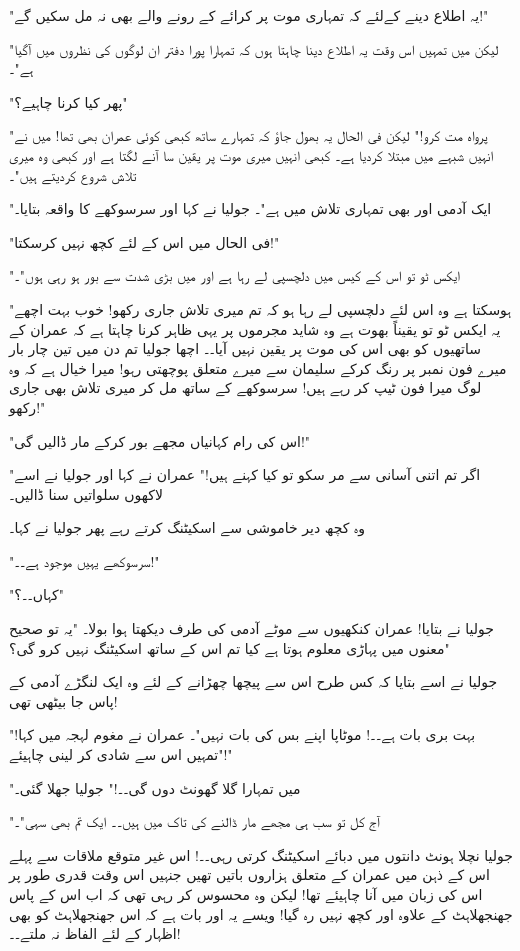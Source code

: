 "یہ اطلاع دینے کےلئے کہ تمہاری موت پر کرائے کے رونے والے بھی نہ مل سکیں گے!"

"لیکن میں تمہیں اس وقت یہ اطلاع دینا چاہتا ہوں کہ تمہارا پورا دفتر ان لوگوں کی نظروں میں آگیا ہے"۔

"پھر کیا کرنا چاہیے؟"

"پرواہ مت کرو!" لیکن فی الحال یہ بھول جاؤ کہ تمہارے ساتھ کبھی کوئی عمران بھی تھا! میں نے انہیں شبہے میں مبتلا کردیا ہے۔ کبھی انہیں میری موت پر یقین سا آنے لگتا ہے اور کبھی وہ میری تلاش شروع کردیتے ہیں"۔

"ایک آدمی اور بھی تمہاری تلاش میں ہے"۔ جولیا نے کہا اور سرسوکھے کا واقعہ بتایا۔

"فی الحال میں اس کے لئے کچھ نہیں کرسکتا!"

"ایکس ٹو تو اس کے کیس میں دلچسپی لے رہا ہے اور میں بڑی شدت سے بور ہو رہی ہوں"۔

"ہوسکتا ہے وہ اس لئے دلچسپی لے رہا ہو کہ تم میری تلاش جاری رکھو! خوب بہت اچھے یہ ایکس ٹو تو یقیناً بھوت ہے وہ شاید مجرموں پر یہی ظاہر کرنا چاہتا ہے کہ عمران کے ساتھیوں کو بھی اس کی موت پر یقین نہیں آیا۔۔ اچھا جولیا تم دن میں تین چار بار میرے فون نمبر پر رنگ کرکے سلیمان سے میرے متعلق پوچھتی رہو! میرا خیال ہے کہ وہ لوگ میرا فون ٹیپ کر رہے ہیں! سرسوکھے کے ساتھ مل کر میری تلاش بھی جاری رکھو!"

"اس کی رام کہانیاں مجھے بور کرکے مار ڈالیں گی!"

"اگر تم اتنی آسانی سے مر سکو تو کیا کہنے ہیں!" عمران نے کہا اور جولیا نے اسے لاکھوں سلواتیں سنا ڈالیں۔

وہ کچھ دیر خاموشی سے اسکیٹنگ کرتے رہے پھر جولیا نے کہا۔

"سرسوکھے یہیں موجود ہے۔۔!"

"کہاں۔۔؟"

جولیا نے بتایا! عمران کنکھیوں سے موٹے آدمی کی طرف دیکھتا ہوا بولا۔ "یہ تو صحیح معنوں میں پہاڑی معلوم ہوتا ہے کیا تم اس کے ساتھ اسکیٹنگ نہیں کرو گی؟"

جولیا نے اسے بتایا کہ کس طرح اس سے پیچھا چھڑانے کے لئے وہ ایک لنگڑے آدمی کے پاس جا بیٹھی تھی!

"بہت بری بات ہے۔۔! موٹاپا اپنے بس کی بات نہیں"۔ عمران نے مغوم لہجہ میں کہا! "تمہیں اس سے شادی کر لینی چاہیئے!"

"میں تمہارا گلا گھونٹ دوں گی۔۔!" جولیا جھلا گئی۔

"آج کل تو سب ہی مجھے مار ڈالنے کی تاک میں ہیں۔۔ ایک تم بھی سہی"۔

جولیا نچلا ہونٹ دانتوں میں دبائے اسکیٹنگ کرتی رہی۔۔! اس غیر متوقع ملاقات سے پہلے اس کے ذہن میں عمران کے متعلق ہزاروں باتیں تھیں جنہیں اس وقت قدری طور پر اس کی زبان میں آنا چاہیئے تھا! لیکن وہ محسوس کر رہی تھی کہ اب اس کے پاس جھنجھلاہٹ کے علاوہ اور کچھ نہیں رہ گیا! ویسے یہ اور بات ہے کہ اس جھنجھلاہٹ کو بھی اظہار کے لئے الفاظ نہ ملتے۔۔!

